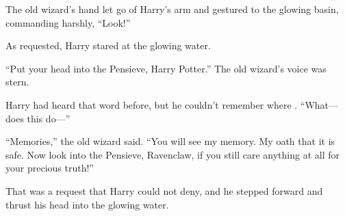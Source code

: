 The old wizard’s hand let go of Harry’s arm and gestured to the glowing basin, commanding harshly,
“Look!”

As requested, Harry stared at the glowing water.

“Put your head into the Pensieve, Harry Potter.” The old wizard’s voice was stern.

Harry had heard that word before, but he couldn’t remember where .
“What—does this do—”

“Memories,” the old wizard said.
“You will see my memory. My oath that it is safe. Now look into the Pensieve, Ravenclaw, if you still care anything at all for your precious truth!”

That was a request that Harry could not deny, and he stepped forward and thrust his head into the glowing water.

\later


